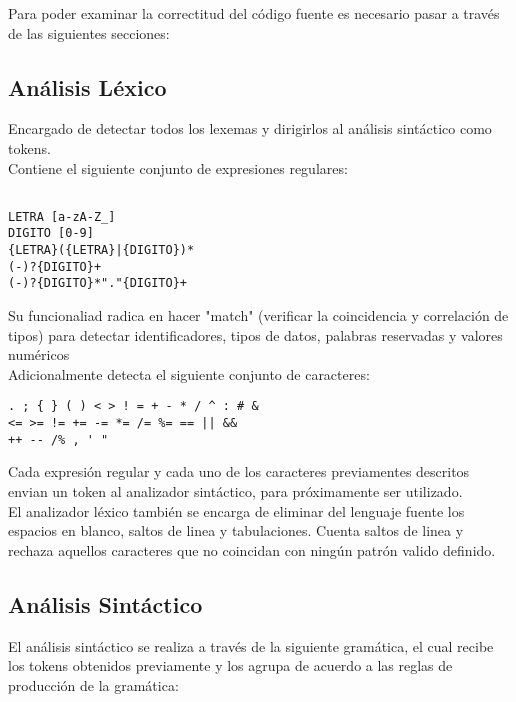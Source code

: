 \documentclass[aspectratio=169]{article}
\begin{document}
	Para poder examinar la correctitud del c\'odigo fuente es necesario pasar a trav\'es de las siguientes 
	secciones:

\subsection{An\'alisis L\'exico}

	Encargado de detectar todos los lexemas y dirigirlos al análisis sintáctico como tokens.\\
	
	Contiene el siguiente conjunto de expresiones regulares:\\

\begin{lstlisting}

LETRA [a-zA-Z_]
DIGITO [0-9]
{LETRA}({LETRA}|{DIGITO})*
(-)?{DIGITO}+
(-)?{DIGITO}*"."{DIGITO}+

\end{lstlisting}

	Su funcionaliad radica en hacer "match" (verificar la coincidencia y correlaci\'on de tipos) para detectar 
	identificadores, tipos de datos, palabras reservadas y valores numéricos\\

	Adicionalmente detecta el siguiente conjunto de caracteres: \\

\begin{lstlisting}
. ; { } ( ) < > ! = + - * / ^ : # &
<= >= != += -= *= /= %= == || &&
++ -- /% , ' "
\end{lstlisting}

	Cada expresión regular y cada uno de los caracteres previamentes descritos envian un token al analizador 
	sintáctico, para pr\'oximamente ser utilizado.\\

	El analizador léxico también se encarga de eliminar del lenguaje fuente los espacios en blanco, saltos
	de linea y tabulaciones. Cuenta saltos de linea y rechaza aquellos caracteres que no coincidan con ningún
	patrón valido definido.


\subsection{An\'alisis Sint\'actico}

	El análisis sintáctico se realiza a través de la siguiente gramática, el cual recibe los tokens obtenidos 
	previamente y los agrupa de acuerdo a las reglas de producción de la gramática:
\end{document}
